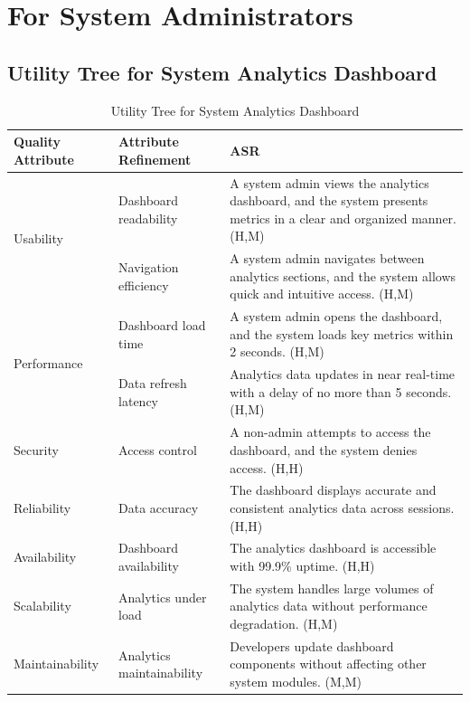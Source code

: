 \documentclass{article}
\begin{document}
\section{For System Administrators}

\subsection{Utility Tree for System Analytics Dashboard}

\begin{table}[H]
\centering
\caption{Utility Tree for System Analytics Dashboard}
\begin{tabular}{|p{3cm}|p{4cm}|p{7cm}|}
\hline
\textbf{Quality Attribute} & \textbf{Attribute Refinement} & \textbf{ASR} \\
\hline

\multirow{2}{*}{Usability}
& Dashboard readability
& A system admin views the analytics dashboard, and the system presents metrics in a clear and organized manner. (H,M) \\
\cline{2-3}
& Navigation efficiency
& A system admin navigates between analytics sections, and the system allows quick and intuitive access. (H,M) \\
\hline

\multirow{2}{*}{Performance}
& Dashboard load time
& A system admin opens the dashboard, and the system loads key metrics within 2 seconds. (H,M) \\
\cline{2-3}
& Data refresh latency
& Analytics data updates in near real-time with a delay of no more than 5 seconds. (H,M) \\
\hline

Security
& Access control
& A non-admin attempts to access the dashboard, and the system denies access. (H,H) \\
\hline

Reliability
& Data accuracy
& The dashboard displays accurate and consistent analytics data across sessions. (H,H) \\
\hline

Availability
& Dashboard availability
& The analytics dashboard is accessible with 99.9\% uptime. (H,H) \\
\hline

Scalability
& Analytics under load
& The system handles large volumes of analytics data without performance degradation. (H,M) \\
\hline

Maintainability
& Analytics maintainability
& Developers update dashboard components without affecting other system modules. (M,M) \\
\hline


\end{tabular}
\end{table}
\end{document}
